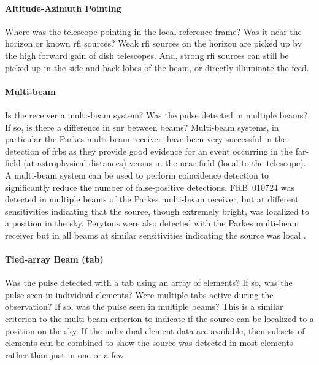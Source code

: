 \documentclass[a4paper,fleqn,usenatbib]{mnras}
\begin{document}
\paragraph{Altitude-Azimuth Pointing}

Where was the telescope pointing in the local reference frame? Was it near the
horizon or known \gls{rfi} sources? Weak \gls{rfi} sources on the horizon are
picked up by the high forward gain of dish telescopes. And, strong \gls{rfi}
sources can still be picked up in the side and back-lobes of the beam, or
directly illuminate the feed.

\paragraph{Multi-beam}

Is the receiver a multi-beam system? Was the pulse detected in multiple beams?
If so, is there a difference in \gls{snr} between beams?  Multi-beam systems, in
particular the Parkes multi-beam receiver, have been very successful in the
detection of \glspl{frb} as they provide good evidence for an event occurring in
the far-field (at astrophysical distances) versus in the near-field (local to
the telescope).  A multi-beam system can be used to perform coincidence
detection to significantly reduce the number of false-positive detections.
FRB~010724 \citep{2007Sci...318..777L} was detected in multiple beams of the
Parkes multi-beam receiver, but at different sensitivities indicating that the
source, though extremely bright, was localized to a position in the sky.
Perytons were also detected with the Parkes multi-beam receiver but in all beams
at similar sensitivities indicating the source was local
\citep{2011ApJ...727...18B}.

\paragraph{Tied-array Beam (\gls{tab})}

Was the pulse detected with a \gls{tab} using an array of elements? If so, was
the pulse seen in individual elements? Were multiple \glspl{tab} active during
the observation? If so, was the pulse seen in multiple beams? This is a similar
criterion to the multi-beam criterion to indicate if the source can be localized
to a position on the sky. If the individual element data are available, then
subsets of elements can be combined to show the source was detected in most
elements rather than just in one or a few.
\end{document}
